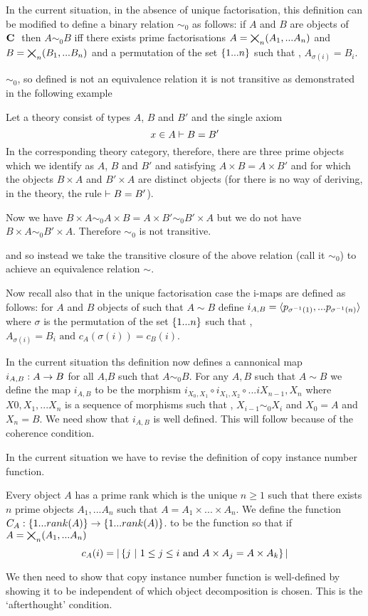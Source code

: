 \documentclass[10pt,a4paper]{scrartcl}
\begin{document}
In the current situation, in the absence of unique factorisation, this definition 
can be modified to define a binary relation $\sim_0$ as follows:
if $A$ and $B$ are objects of $\textbf{C}\ $ then $A \sim_0 B$ 
iff there exists prime factorisations 
$A = \bigtimes_{n}(A_1,...A_n)$ 
and $B= \bigtimes_{n}(B_1,...B_n)$ 
and  a permutation of the set $\left\{1...n\right\}$ such that 
\foreachi, $A_{\sigma(i)}=B_i$.

$\sim_0$, so defined is not
an equivalence relation  it is not transitive as demonstrated in the following example
\begin{notebox}[Example]
Let a theory consist of types $A$, $B$ and $B'$ and the single axiom 
\begin{equation}
x \in A \vdash B=B'
\end{equation}
In the corresponding theory category, therefore, there are three prime objects which
we identify as $A$, $B$ and $B'$ and satisfying $A \times B = A \times B'$ and 
for which the objects $B \times A$ and $B' \times A$ are distinct objects (for there is no way of deriving, in the theory, the rule $\vdash B = B'$). 

Now we have $B \times A \sim_0 A \times B = A \times B' \sim_0 B' \times A$
but we do not have $B \times A \sim_0 B' \times A$. Therefore $\sim_0$ is not transitive.
\end{notebox}


 and so instead we take the transitive closure of the above relation (call it $\sim_0$) to
achieve an equivalence relation $\sim$.

Now recall also that in the unique factorisation case the i-maps are defined as follows:
for $A$ and $B$ objects of \catcw such that $A\sim B$ define $i_{A,B}=\langle p_{\sigma^{-1}(1)},...p_{\sigma^{-1}(n)}\rangle$ where $\sigma$ is the permutation of the set $\left\{1...n\right\}$ 
such that \foreachi, $A_{\sigma(i)}=B_i \mbox{ and }  c_A(\sigma(i)) = c_B(i)$. 

In the current situation ths definition now defines a cannonical map $i_{A,B}: A \rightarrow B$ 
for all $A$,$B$ such that $A \sim_0 B$. 
For any $A,B$ such that $A \sim B$ we define the map $i_{A,B}$ to be the morphism
$i_{X_0,X_1} \circ i_{X_1,X_2} \circ ... i{X_{n-1},X_n}$ where $X0,X_1,...X_n$ is a sequence
of morphisms such that \foreachi, $X_{i-1} \sim_0 X_i$ and $X_0=A$ and $X_n=B$. 
We need show that $i_{A,B}$ is well defined. This will follow because of the coherence
condition. 
 
In the current situation we have to revise the definition of copy instance number function.
\begin{definition}
Every object $A$ has a prime rank which is the unique $n \geq 1$ such that
there exists $n$ prime objects $A_1,...A_n$ such that $A=A_1 \times ... \times A_n$.
We define the  function $C_A: \left\{1...rank(A)\right\} \rightarrow  \left\{1...rank(A)\right\}$.
to be the function so that if $A=\bigtimes_{n}(A_1,...A_n)$
$$
c_A(i) = |\left\{j \ \middle|\ 1 \leq j \leq i 
\mbox{ and } 
A \times A_j = A \times A_k\right\}|
$$
\end{definition}
We then need to show that copy instance number function is well-defined by showing it to be independent of which object decomposition is chosen. This is the `afterthought' condition.
\end{document}
